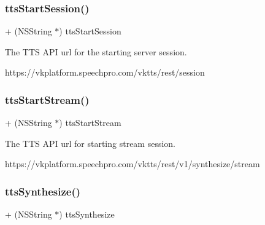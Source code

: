 \subsubsection{\texorpdfstring{tts\+Start\+Session()}{ttsStartSession()}}
{\footnotesize\ttfamily + (N\+S\+String $\ast$) tts\+Start\+Session \begin{DoxyParamCaption}{ }\end{DoxyParamCaption}}

The T\+TS A\+PI url for the starting server session. 
\begin{DoxyCode}
https:\textcolor{comment}{//vkplatform.speechpro.com/vktts/rest/session}
\end{DoxyCode}
 \hypertarget{interface_s_t_c_t_t_s_u_r_l_manager_a334b1d5bf33e254331ed23db43f4a4a1}{}\label{interface_s_t_c_t_t_s_u_r_l_manager_a334b1d5bf33e254331ed23db43f4a4a1} 
\subsubsection{\texorpdfstring{tts\+Start\+Stream()}{ttsStartStream()}}
{\footnotesize\ttfamily + (N\+S\+String $\ast$) tts\+Start\+Stream \begin{DoxyParamCaption}{ }\end{DoxyParamCaption}}

The T\+TS A\+PI url for starting stream session. 
\begin{DoxyCode}
https:\textcolor{comment}{//vkplatform.speechpro.com/vktts/rest/v1/synthesize/stream}
\end{DoxyCode}
 \hypertarget{interface_s_t_c_t_t_s_u_r_l_manager_a6fa3054433c0e2b4d3c5d2e788dcd018}{}\label{interface_s_t_c_t_t_s_u_r_l_manager_a6fa3054433c0e2b4d3c5d2e788dcd018} 
\subsubsection{\texorpdfstring{tts\+Synthesize()}{ttsSynthesize()}}
{\footnotesize\ttfamily + (N\+S\+String $\ast$) tts\+Synthesize \begin{DoxyParamCaption}{ }\end{DoxyParamCaption}}

